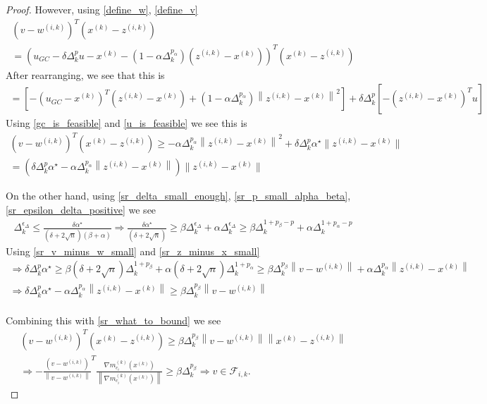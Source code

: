 \documentclass{article}
\theoremstyle{case}
\numberwithin{theorem}{subsection}
\newcommand{\dk}{\Delta_k}
\newcommand{\fik}{{\mathcal F_{i, k}}}
\newcommand{\gmcik}{{\nabla m_{c_i}^{(k)}\left(\xk\right)}}
\newcommand{\minanglealpha}{{ \alpha^{\star} }}
\newcommand{\wik}{{w^{(i, k)}}}
\newcommand{\xk}{{x^{(k)}}}
\newcommand{\zik}{{z^{(i, k)}}}
\begin{document}
\begin{proof}
However, using \cref{define_w}, \cref{define_v}
\begin{align*}
\left(v - \wik \right)^T\left(\xk - \zik \right) \\
=\left( u_{GC} - \delta\dk^{p}u - \xk - \left(1 - \alpha\dk^{p_{\alpha}}\right)\left(\zik - \xk\right) \right)^T\left(\xk - \zik \right)
\end{align*}
After rearranging, we see that this is
\begin{align*}
=\left[
-\left( u_{GC}- \xk\right)^T\left(\zik - \xk \right) 
+\left(1 - \alpha\dk^{p_{\alpha}}\right)\left\|\zik - \xk\right\|^2
\right]
+ \delta\dk^{p}\left[ -\left(\zik - \xk\right)^Tu\right]
\end{align*}
Using \cref{gc_is_feasible} and \cref{u_is_feasible} we see this is
\begin{align}
\left(v - \wik \right)^T\left(\xk - \zik \right)  \ge - \alpha \dk ^{p_{\alpha}} \left\|\zik - \xk\right\|^2
+ \delta\dk^{p} \minanglealpha \|\zik - \xk\| \nonumber \\
= \left(
\delta\dk^{p} \minanglealpha
- \alpha \dk ^{p_{\alpha}} \left\|\zik - \xk\right\|
\right)\|\zik - \xk\| \label{sr_what_to_bound}
\end{align}

On the other hand, using \cref{sr_delta_small_enough}, \cref{sr_p_small_alpha_beta}, \cref{sr_epsilon_delta_positive} we see
\begin{align*}
\dk^{\epsilon_{\Delta}} \le \frac{\delta \minanglealpha}{\left(\delta + 2\sqrt{n}\right) \left(\beta +\alpha\right)} 
\Longrightarrow\frac{ \delta \minanglealpha }{\left(\delta + 2\sqrt{n}\right)} \ge \beta\dk^{\epsilon_{\Delta}} + \alpha\dk^{\epsilon_{\Delta}} 
\ge \beta \dk^{1 + p_{\beta} - p} + \alpha \dk ^{1 + p_{\alpha} - p}
\end{align*}
Using \cref{sr_v_minus_w_small} and \cref{sr_z_minus_x_small}
\begin{align*}
\Longrightarrow \delta\dk^{p} \minanglealpha  \ge \beta \left(\delta + 2\sqrt{n}\right) \dk^{1 + p_{\beta}} + \alpha\left(\delta + 2\sqrt{n}\right)  \dk ^{1 + p_{\alpha}}
\ge \beta \dk^{p_{\beta}}\left\|v - \wik\right\| + \alpha \dk ^{p_{\alpha}} \left\|\zik - \xk\right\|\\
\Longrightarrow \delta\dk^{p} \minanglealpha - \alpha \dk ^{p_{\alpha}} \left\|\zik - \xk\right\|  \ge \beta \dk^{p_{\beta}}\left\|v - \wik\right\| \\
\end{align*}

Combining this with \cref{sr_what_to_bound} we see
\begin{align*}
\left(v - \wik \right)^T\left(\xk - \zik \right) \ge \beta \dk^{p_{\beta}}\left\|v - \wik\right\| \left\|\xk - \zik\right\| \\
\Longrightarrow -\frac {\left(v - \wik \right)}{\left\|v - \wik \right\|}^T\frac{\gmcik}{\left\|\gmcik\right\|}\ge\beta \dk^{p_{\beta}} 
\Longrightarrow v \in \fik.
\end{align*}
\end{proof}
\end{document}
